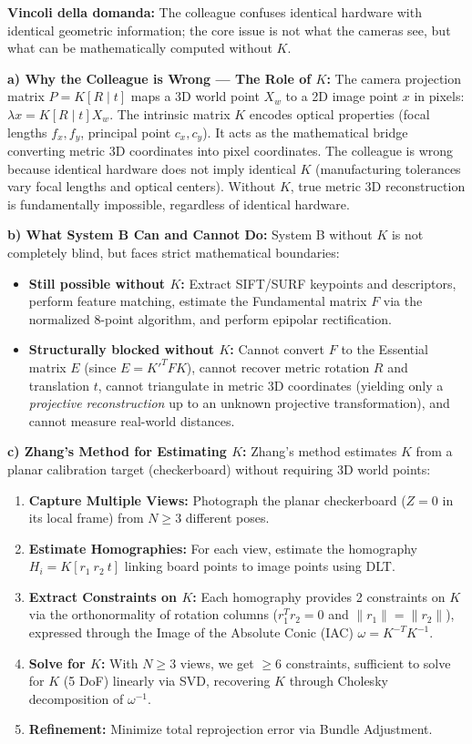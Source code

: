 \textbf{Vincoli della domanda:}
The colleague confuses identical hardware with identical geometric information; the core issue is not what the cameras see, but what can be mathematically computed without $K$.

\textbf{a) Why the Colleague is Wrong — The Role of $K$:}
The camera projection matrix $P = K[R \mid t]$ maps a 3D world point $X_w$ to a 2D image point $x$ in pixels: $\lambda x = K[R \mid t] X_w$. 
The intrinsic matrix $K$ encodes optical properties (focal lengths $f_x, f_y$, principal point $c_x, c_y$). It acts as the mathematical bridge converting metric 3D coordinates into pixel coordinates. 
The colleague is wrong because identical hardware does not imply identical $K$ (manufacturing tolerances vary focal lengths and optical centers). Without $K$, true metric 3D reconstruction is fundamentally impossible, regardless of identical hardware.

\textbf{b) What System B Can and Cannot Do:}
System B without $K$ is not completely blind, but faces strict mathematical boundaries:
\begin{itemize}
    \item \textbf{Still possible without $K$:} Extract SIFT/SURF keypoints and descriptors, perform feature matching, estimate the Fundamental matrix $F$ via the normalized 8-point algorithm, and perform epipolar rectification.
    \item \textbf{Structurally blocked without $K$:} Cannot convert $F$ to the Essential matrix $E$ (since $E = K'^T F K$), cannot recover metric rotation $R$ and translation $t$, cannot triangulate in metric 3D coordinates (yielding only a \textit{projective reconstruction} up to an unknown projective transformation), and cannot measure real-world distances.
\end{itemize}

\textbf{c) Zhang's Method for Estimating $K$:}
Zhang's method estimates $K$ from a planar calibration target (checkerboard) without requiring 3D world points:
\begin{enumerate}
    \item \textbf{Capture Multiple Views:} Photograph the planar checkerboard ($Z=0$ in its local frame) from $N \ge 3$ different poses.
    \item \textbf{Estimate Homographies:} For each view, estimate the homography $H_i = K[r_1 \ r_2 \ t]$ linking board points to image points using DLT.
    \item \textbf{Extract Constraints on $K$:} Each homography provides 2 constraints on $K$ via the orthonormality of rotation columns ($r_1^T r_2 = 0$ and $\|r_1\| = \|r_2\|$), expressed through the Image of the Absolute Conic (IAC) $\omega = K^{-T}K^{-1}$.
    \item \textbf{Solve for $K$:} With $N \ge 3$ views, we get $\ge 6$ constraints, sufficient to solve for $K$ (5 DoF) linearly via SVD, recovering $K$ through Cholesky decomposition of $\omega^{-1}$.
    \item \textbf{Refinement:} Minimize total reprojection error via Bundle Adjustment.
\end{enumerate}
